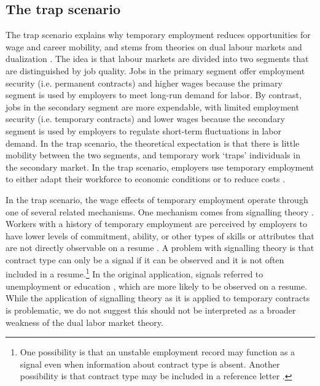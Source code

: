 \documentclass[12pt]{article}
\begin{document}
\subsection{The trap scenario}

The trap scenario explains why temporary employment reduces opportunities for wage and career mobility, and stems from theories on dual labour markets \citep{doeringer_piore_1971,reich_gordon_edwards_1973} and dualization \citep{emmenegger_etal_2012,eichhorst_marx_2015}.  The idea is that labour markets are divided into two segments that are distinguished by job quality.  Jobs in the primary segment offer employment security (i.e. permanent contracts) and higher wages because the primary segment is used by employers to meet long-run demand for labor.  By contrast, jobs in the secondary segment are more expendable, with limited employment security (i.e. temporary contracts) and lower wages because the secondary segment is used by employers to regulate short-term fluctuations in labor demand.  In the trap scenario, the theoretical expectation is that there is little mobility between the two segments, and temporary work `traps' individuals in the secondary market.  In the trap scenario, employers use temporary employment to either adapt their workforce to economic conditions or to reduce costs \citep{mattijssen_scarred_2022}.  

In the trap scenario, the wage effects of temporary employment operate through one of several related mechanisms.  One mechanism comes from signalling theory \citep{spence_job_1973}.  Workers with a history of temporary employment are perceived by employers to have lower levels of commitment, ability, or other types of skills or attributes that are not directly observable on a resume \citep{mooi-reci_fixed-term_2015}.  A problem with signalling theory is that contract type can only be a signal if it can be observed and it is not often included in a resume.\footnote{One possibility is that an unstable employment record may function as a signal even when information about contract type is absent.  Another possibility is that contract type may be included in a reference letter \citep{hagen_temporary_2002}.}  In the original application, signals referred to unemployment or education \citep{spence_job_1973}, which are more likely to be observed on a resume.  While the application of signalling theory as it is applied to temporary contracts is problematic, we do not suggest this should not be interpreted as a broader weakness of the dual labor market theory.  
\end{document}

